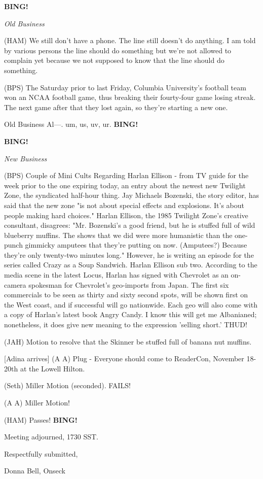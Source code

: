 \documentclass[12pt]{article}
\newcommand{\bing}{{\bf BING!} }
\newcommand{\goto}[1]{\bing \vskip 12pt \centerline{{\em{#1}}}}
\begin{document}
\goto{Old Business}

(HAM) We still don't have a phone. The line still doesn't do anything. I am told by various persons the line should do something but we're not allowed to complain yet because we not supposed to know that the line should do something.

(BPS) The Saturday prior to last Friday, Columbia University's football team won an NCAA football game, thus breaking their fourty-four game losing streak. The next game after that they lost again, so they're starting a new one.

Old Business Al---. um, us, uv, ur. \bing

\goto{New Business}

(BPS) Couple of Mini Cults Regarding Harlan Ellison - from TV guide for the week prior to the one expiring today, an entry about the newest new Twilight Zone, the syndicated half-hour thing. Jay Michaels Bozenski, the story editor, has said that the new zone "is not about special effects and explosions. It's about people making hard choices."  Harlan Ellison, the 1985 Twilight Zone's creative consultant, disagrees: "Mr. Bozenski's a good friend, but he is stuffed full of wild blueberry muffins. The shows that we did were more humanistic than the one-punch gimmicky amputees that they're putting on now. (Amputees?) Because they're only twenty-two minutes long." However, he is writing an episode for the series called Crazy as a Soup Sandwich. Harlan Ellison sub two. According to the media scene in the latest Locus, Harlan has signed with Chevrolet as an on-camera spokesman for Chevrolet's geo-imports from Japan. The first six commercials to be seen as thirty and sixty second spots, will be shown first on the West coast, and if successful will go nationwide. Each geo will also come with a copy of Harlan's latest book Angry Candy. I know this will get me Albanianed; nonetheless, it does give new meaning to the expression 'selling short.' THUD!

(JAH) Motion to resolve that the Skinner be stuffed full of banana nut muffins.

[Adina arrives] (A A) Plug - Everyone should come to ReaderCon, November 18-20th at the Lowell Hilton.

(Seth) Miller Motion (seconded). FAILS!

(A A) Miller Motion!

(HAM) Passes! \bing

\vspace{12pt}

\noindent
Meeting adjourned, 1730 SST.

\vspace{18pt}

\centerline{Respectfully submitted,}
\centerline{Donna Bell, Onseck}
\end{document}
